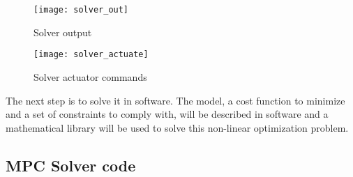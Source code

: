 \documentclass[11pt]{article}
\begin{document}
\begin{figure}[h]
    \centering
    \texttt{[image: solver\_out]}
    \caption{Solver output}
    \label{fig:solver_out}
\end{figure}

\begin{figure}[h]
    \centering
    \texttt{[image: solver\_actuate]}
    \caption{Solver actuator commands}
    \label{fig:solver_actuate}
\end{figure}

\FloatBarrier

The next step is to solve it in software. The model, a cost function to minimize and a set of constraints to comply with, will be described in software and a mathematical library will be used to solve this non-linear optimization problem.

\subsection{MPC Solver code}
\end{document}
